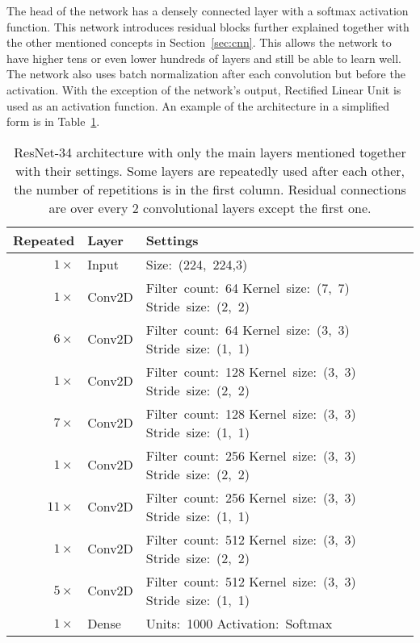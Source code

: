 The head of the network has a densely connected layer with a softmax activation function. This network introduces residual blocks further explained together with the other mentioned concepts in Section~\ref{sec:cnn}. This allows the network to have higher tens or even lower hundreds of layers and still be able to learn well. The network also uses batch normalization after each convolution but before the activation. With the exception of the network's output, Rectified Linear Unit is used as an activation function. An example of the architecture in a simplified form is in Table~\ref{tab:resnet}.

\begin{table}[!ht]
    \centering
    \footnotesize
    \begin{tabular}{ |r|m{5em}|m{9em}|l| }
        \hline
            Repeated & Layer & Settings \\ 
        \hline
        \hline
            $1 \times$ & Input & \mbox{Size: (224, 224,3)}\\
        \hline
            $1 \times$ & Conv2D & \mbox{Filter count: 64} \mbox{Kernel size: (7, 7)} \mbox{Stride size: (2, 2)}\\
        \hline
            $6 \times$ & Conv2D & \mbox{Filter count: 64} \mbox{Kernel size: (3, 3)} \mbox{Stride size: (1, 1)}\\
        \hline
            $1 \times$ & Conv2D & \mbox{Filter count: 128} \mbox{Kernel size: (3, 3)} \mbox{Stride size: (2, 2)}\\
        \hline
            $7 \times$ & Conv2D & \mbox{Filter count: 128} \mbox{Kernel size: (3, 3)} \mbox{Stride size: (1, 1)}\\
        \hline
            $1 \times$ & Conv2D & \mbox{Filter count: 256} \mbox{Kernel size: (3, 3)} \mbox{Stride size: (2, 2)}\\
        \hline
            $11 \times$ & Conv2D & \mbox{Filter count: 256} \mbox{Kernel size: (3, 3)} \mbox{Stride size: (1, 1)}\\
        \hline
            $1 \times$ & Conv2D & \mbox{Filter count: 512} \mbox{Kernel size: (3, 3)} \mbox{Stride size: (2, 2)}\\
        \hline
            $5 \times$ & Conv2D & \mbox{Filter count: 512} \mbox{Kernel size: (3, 3)} \mbox{Stride size: (1, 1)}\\
        \hline
            $1 \times$ & Dense & \mbox{Units: 1000} \mbox{Activation: Softmax} \\
        \hline
        \end{tabular}
    \caption{ResNet-34 architecture with only the main layers mentioned together with their settings. Some layers are repeatedly used after each other, the number of repetitions is in the first column. Residual connections are over every 2 convolutional layers except the first one.}
    \label{tab:resnet}
\end{table}

